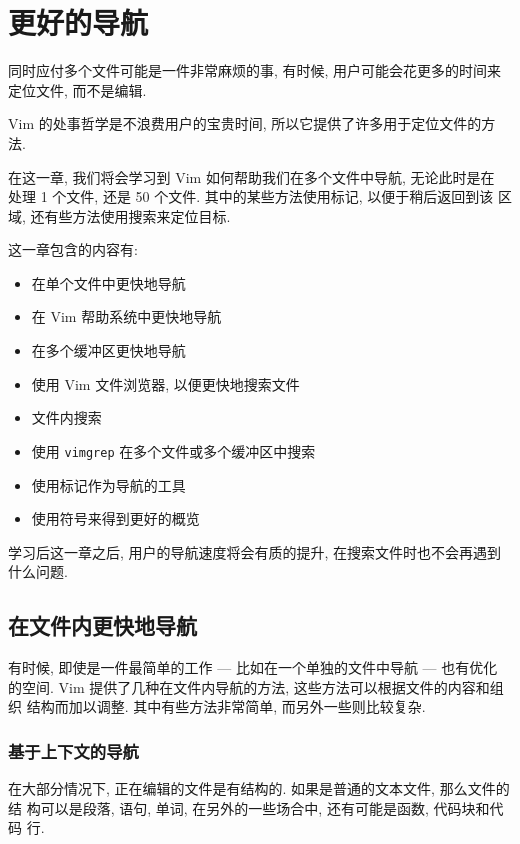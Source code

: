 \chapter{更好的导航}
\label{chap:better_navigation}
同时应付多个文件可能是一件非常麻烦的事, 有时候, 用户可能会花更多的时间来
定位文件, 而不是编辑.

Vim 的处事哲学是不浪费用户的宝贵时间, 所以它提供了许多用于定位文件的方法.

在这一章, 我们将会学习到 Vim 如何帮助我们在多个文件中导航, 无论此时是在
处理 1 个文件, 还是 50 个文件. 其中的某些方法使用标记, 以便于稍后返回到该
区域, 还有些方法使用搜索来定位目标.

这一章包含的内容有:
\begin{itemize}
    \item 在单个文件中更快地导航
    \item 在 Vim 帮助系统中更快地导航
    \item 在多个缓冲区更快地导航
    \item 使用 Vim 文件浏览器, 以便更快地搜索文件
    \item 文件内搜索
    \item 使用 \texttt{vimgrep} 在多个文件或多个缓冲区中搜索
    \item 使用标记作为导航的工具
    \item 使用符号来得到更好的概览
\end{itemize}

学习后这一章之后, 用户的导航速度将会有质的提升, 在搜索文件时也不会再遇到
什么问题.
\section{在文件内更快地导航}
\label{sec:faster_navigation_in_a_file}

有时候, 即使是一件最简单的工作 --- 比如在一个单独的文件中导航 --- 也有优化
的空间. Vim 提供了几种在文件内导航的方法, 这些方法可以根据文件的内容和组织
结构而加以调整. 其中有些方法非常简单, 而另外一些则比较复杂.

\subsection{基于上下文的导航}
\label{subsec:context_aware_navigation}

在大部分情况下, 正在编辑的文件是有结构的. 如果是普通的文本文件, 那么文件的结
构可以是段落, 语句, 单词, 在另外的一些场合中, 还有可能是函数, 代码块和代码
行.

